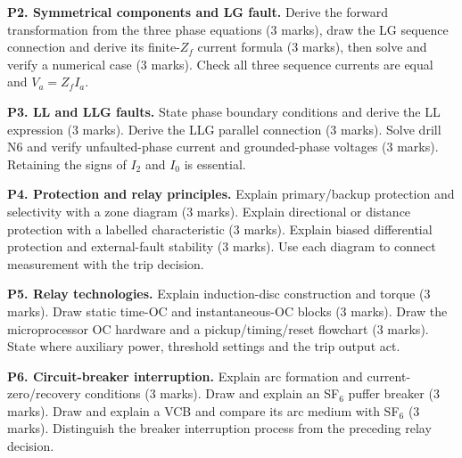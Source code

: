 \documentclass[11pt,a4paper]{article}
\begin{document}
\textbf{P2. Symmetrical components and LG fault.} Derive the forward transformation from the three phase equations (3 marks), draw the LG sequence connection and derive its finite-$Z_f$ current formula (3 marks), then solve and verify a numerical case (3 marks). Check all three sequence currents are equal and $V_a=Z_fI_a$.

\textbf{P3. LL and LLG faults.} State phase boundary conditions and derive the LL expression (3 marks). Derive the LLG parallel connection (3 marks). Solve drill N6 and verify unfaulted-phase current and grounded-phase voltages (3 marks). Retaining the signs of $I_2$ and $I_0$ is essential.

\textbf{P4. Protection and relay principles.} Explain primary/backup protection and selectivity with a zone diagram (3 marks). Explain directional or distance protection with a labelled characteristic (3 marks). Explain biased differential protection and external-fault stability (3 marks). Use each diagram to connect measurement with the trip decision.

\textbf{P5. Relay technologies.} Explain induction-disc construction and torque (3 marks). Draw static time-OC and instantaneous-OC blocks (3 marks). Draw the microprocessor OC hardware and a pickup/timing/reset flowchart (3 marks). State where auxiliary power, threshold settings and the trip output act.

\textbf{P6. Circuit-breaker interruption.} Explain arc formation and current-zero/recovery conditions (3 marks). Draw and explain an SF$_6$ puffer breaker (3 marks). Draw and explain a VCB and compare its arc medium with SF$_6$ (3 marks). Distinguish the breaker interruption process from the preceding relay decision.
\Needspace{130mm}
\end{document}
